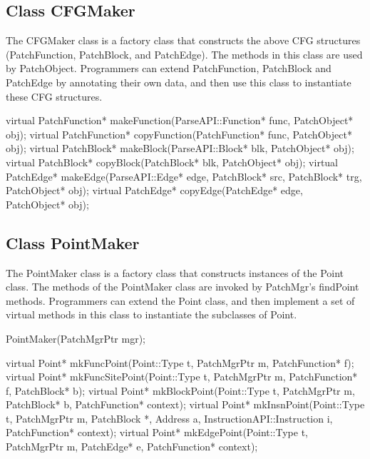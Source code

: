 \subsection{Class CFGMaker}
\label{sec:cfgmaker}


The CFGMaker class is a factory class that constructs the above CFG structures
(PatchFunction, PatchBlock, and PatchEdge). The methods in this class are used
by PatchObject. Programmers can extend PatchFunction, PatchBlock and PatchEdge
by annotating their own data, and then use this class to instantiate these CFG
structures.


\begin{apient}
virtual PatchFunction* makeFunction(ParseAPI::Function* func, PatchObject* obj);
virtual PatchFunction* copyFunction(PatchFunction* func, PatchObject* obj);
virtual PatchBlock* makeBlock(ParseAPI::Block* blk, PatchObject* obj);
virtual PatchBlock* copyBlock(PatchBlock* blk, PatchObject* obj);
virtual PatchEdge* makeEdge(ParseAPI::Edge* edge, PatchBlock* src,
                            PatchBlock* trg, PatchObject* obj);
virtual PatchEdge* copyEdge(PatchEdge* edge, PatchObject* obj);
\end{apient}


\subsection{Class PointMaker}
\label{sec:pointmaker}


The PointMaker class is a factory class that constructs instances of the Point
class. The methods of the PointMaker class are invoked by PatchMgr's findPoint
methods. Programmers can extend the Point class, and then implement a set of
virtual methods in this class to instantiate the subclasses of Point.


\begin{apient}
PointMaker(PatchMgrPtr mgr);
\end{apient}


\begin{apient}
virtual Point* mkFuncPoint(Point::Type t, PatchMgrPtr m, PatchFunction* f);
virtual Point* mkFuncSitePoint(Point::Type t, PatchMgrPtr m, PatchFunction* f, PatchBlock* b);
virtual Point* mkBlockPoint(Point::Type t, PatchMgrPtr m, PatchBlock* b, PatchFunction* context);
virtual Point* mkInsnPoint(Point::Type t, PatchMgrPtr m, PatchBlock *, Address a,
                           InstructionAPI::Instruction i, PatchFunction* context);
virtual Point* mkEdgePoint(Point::Type t, PatchMgrPtr m, PatchEdge* e, PatchFunction* context);
\end{apient}


